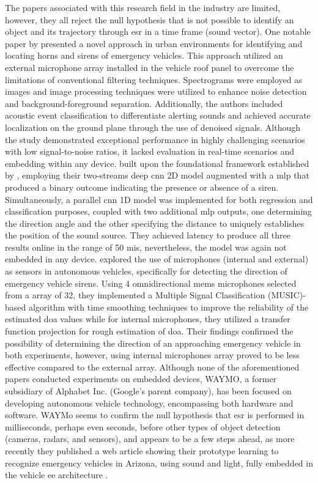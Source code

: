The papers associated with this research field in the industry are limited, however, they all reject the null hypothesis that is not possible to identify an object and its trajectory through \gls{esr} in a time frame (sound vector). One notable paper by \textcite{Marchegiani2022} presented a novel approach in urban environments for identifying and locating horns and sirens of emergency vehicles. This approach utilized an external microphone array installed in the vehicle roof panel to overcome the limitations of conventional filtering techniques. Spectrograms were employed as images and image processing techniques were utilized to enhance noise detection and background-foreground separation. Additionally, the authors included acoustic event classification to differentiate alerting sounds and achieved accurate localization on the ground plane through the use of denoised signals. Although the study demonstrated exceptional performance in highly challenging scenarios with low signal-to-noise ratios, it lacked evaluation in real-time scenarios and embedding within any device. \textcite{Sun2021} built upon the foundational framework established by \textcite{Tran2020}, employing their two-streams deep \gls{cnn} 2D model augmented with a \gls{mlp} that produced a binary outcome indicating the presence or absence of a siren. Simultaneously, a parallel \gls{cnn} 1D model was implemented for both regression and classification purposes, coupled with two additional \gls{mlp} outputs, one determining the direction angle and the other specifying the distance to uniquely establishes the position of the sound source. They achieved latency to produce all three results online in the range of 50 \gls{mi}\gls{s}, nevertheless, the model was again not embedded in any device. \textcite{Shabtai2019} explored the use of microphones (internal and external) as sensors in autonomous vehicles, specifically for detecting the direction of emergency vehicle sirens. Using 4 omnidirectional \gls{mems} microphones selected from a array of 32, they implemented a Multiple Signal Classification (MUSIC)-based algorithm with time smoothing techniques to improve the reliability of the estimated \gls{doa} values while for internal microphones, they utilized a transfer function projection for rough estimation of \gls{doa}. Their findings confirmed the possibility of determining the direction of an approaching emergency vehicle in both experiments, however, using internal microphones array proved to be less effective compared to the external array. Although none of the aforementioned papers conducted experiments on embedded devices, WAYMO, a former subsidiary of Alphabet Inc. (Google's parent company), has been focused on developing autonomous vehicle technology, encompassing both hardware and software. WAYMo seems to confirm the null hypothesis that \gls{esr} is performed in milliseconds, perhaps even seconds, before other types of object detection (cameras, radars, and sensors), and appears to be a few steps ahead, as more recently they published a web article showing their prototype learning to recognize emergency vehicles in Arizona, using sound and light, fully embedded in the vehicle \gls{ee} architecture \cite{WAYMO2023}. 

